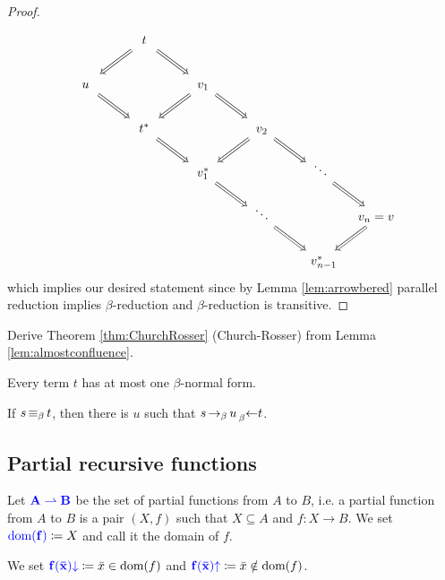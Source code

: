\begin{proof}
\begin{equation*}
\begin{tikzcd}[/tikz/cells={/tikz/nodes={shape=asymmetrical
            rectangle,text width=0.5cm,text height=2ex,text depth=0.3ex,align=center}}]
            & t \ar[dl, Rightarrow] \ar[dr, Rightarrow] & \\
            u \ar[dr, Rightarrow] && v_1 \ar[dr, Rightarrow] \ar[dl, Rightarrow] \\
            & t^* \ar[dr, Rightarrow] && v_2 \ar[dr, Rightarrow] \ar[dl, Rightarrow] \\
            && v_1^* \ar[dr, Rightarrow] && \ddots \ar[dr, Rightarrow] \\
            &&& \ddots \ar[dr, Rightarrow] && \mathllap{v_n} = \mathrlap{v} \ar[dl, Rightarrow]\\
            &&&&\mathllap{v}_{n\mathrlap{-1}}^*
        \end{tikzcd}
    \end{equation*}
    which implies our desired statement since by Lemma \ref{lem:arrowbered} parallel reduction implies $\beta$-reduction and $\beta$-reduction is transitive. 
\end{proof}

\begin{exercise}
    Derive Theorem \ref{thm:ChurchRosser} (Church-Rosser) from Lemma \ref{lem:almostconfluence}.
\end{exercise}

\begin{boxcor}
    Every term $t$ has at most one $\beta$-normal form.
\end{boxcor}

\begin{boxcor}
    If $s \operatorname{\equiv_{\beta}} t$, then there is $u$ such that $s \operatorname{\to_{\beta}} u \prescript{}{\beta}{\leftarrow} t$.
\end{boxcor}

\subsection{Partial recursive functions}

\begin{boxdefi}
    Let $\alert{A \rightharpoonup B}$ be the set of \alert{partial functions} from $A$ to $B$, i.e. a partial function from $A$ to $B$ is a pair $(X, f)$ such that $X \subseteq A$ and $f \colon X \to B$.
    We set $\alert{\domain{f}} \coloneq X$ and call it the \alert{domain} of $f$.
\end{boxdefi}

\begin{notation}
    We set $\alert{f(\vect{x})\down} \coloneq \vect{x} \in \domain{f}$ and $\alert{f(\vect{x})\up} \coloneq \vect{x} \notin \domain{f}$.
\end{notation}

